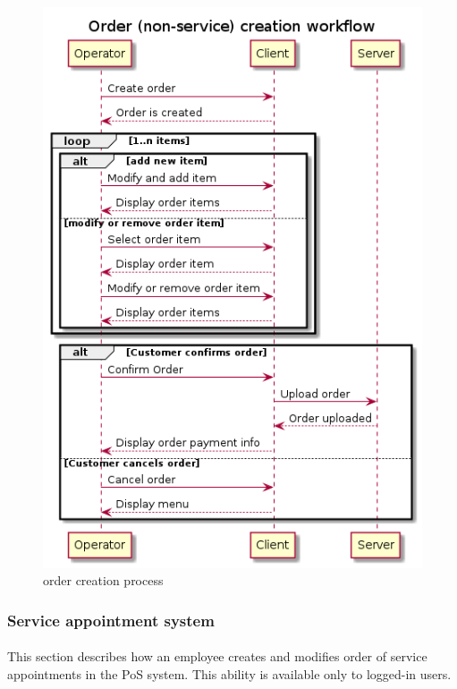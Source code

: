 \documentclass{article}
\begin{document}
    \begin{figure}[H]
        \centering
        \includegraphics[width=0.9\linewidth]{PSP/lab-1/diagrams/sequence/order.png}
        \caption{order creation process}
        \label{}
    \end{figure}


    \subsubsection{Service appointment system}
    \paragraph{}This section describes how an employee creates and modifies order of service appointments in the PoS system. This ability is available only to logged-in users.
\end{document}
